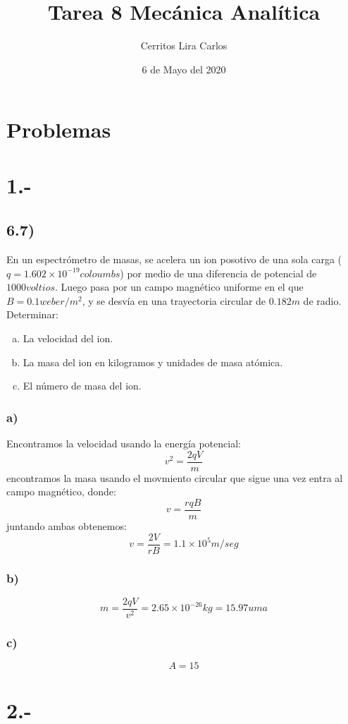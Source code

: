 \documentclass{article}
\title{Tarea 8 Mecánica Analítica}
\author{Cerritos Lira Carlos}
\date{6 de Mayo del 2020}
\begin{document}
\maketitle
\section*{Problemas}
\section*{1.-}
\subsection*{6.7)}
En un espectrómetro de masas, se acelera un ion posotivo de una sola carga 
($q=1.602 \times 10^{-19} coloumbs$) por medio de una diferencia de potencial de 
$1000 voltios$. Luego pasa por un campo magnético uniforme en el que $B=0.1weber/m^2$,
y se desvía en una trayectoria circular de $0.182m$ de radio. Determinar:
\begin{enumerate}[a)]
    \item La velocidad del ion.
    \item La masa del ion en kilogramos y unidades de masa atómica.
    \item El número de masa del ion.
\end{enumerate}
\begin{tcolorbox}[breakable]
    \subsubsection*{a)}
    Encontramos la velocidad usando la energía potencial:
    \[ v^2 = \frac{2qV}{m} \]
    encontramos la masa usando el movmiento circular que sigue una vez entra al campo magnético, donde:
    \[ v = \frac{rqB}{m} \]
    juntando ambas obtenemos:
    \[ v = \frac{2V}{rB} = 1.1 \times 10^5 m/seg\]
    \subsubsection*{b)}
    \[ m = \frac{2qV}{v^2} = 2.65 \times 10^{-26}kg = 15.97uma\]
    \subsubsection*{c)}
    \[ A = 15 \]
\end{tcolorbox}

\section*{2.-}
\end{document}
